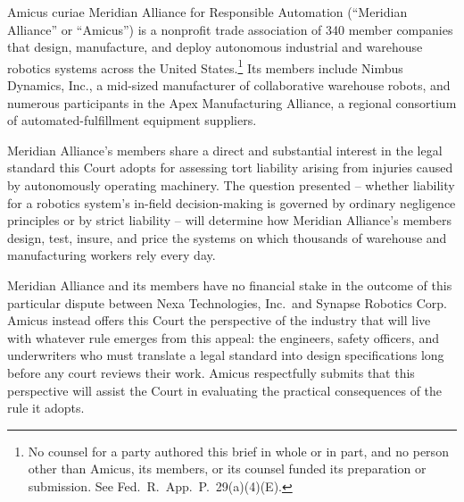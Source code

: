 
\setcounter{page}{1}
\pagestyle{fancy}
\BriefBody


Amicus curiae Meridian Alliance for Responsible Automation (``Meridian Alliance'' or ``Amicus'') is a nonprofit trade association of 340 member companies that design, manufacture, and deploy autonomous industrial and warehouse robotics systems across the United States.\footnote{No counsel for a party authored this brief in whole or in part, and no person other than Amicus, its members, or its counsel funded its preparation or submission. See Fed.\ R.\ App.\ P.\ 29(a)(4)(E).} Its members include Nimbus Dynamics, Inc., a mid-sized manufacturer of collaborative warehouse robots, and numerous participants in the Apex Manufacturing Alliance, a regional consortium of automated-fulfillment equipment suppliers.

Meridian Alliance's members share a direct and substantial interest in the legal standard this Court adopts for assessing tort liability arising from injuries caused by autonomously operating machinery. The question presented -- whether liability for a robotics system's in-field decision-making is governed by ordinary negligence principles or by strict liability -- will determine how Meridian Alliance's members design, test, insure, and price the systems on which thousands of warehouse and manufacturing workers rely every day.

Meridian Alliance and its members have no financial stake in the outcome of this particular dispute between Nexa Technologies, Inc.\ and Synapse Robotics Corp. Amicus instead offers this Court the perspective of the industry that will live with whatever rule emerges from this appeal: the engineers, safety officers, and underwriters who must translate a legal standard into design specifications long before any court reviews their work. Amicus respectfully submits that this perspective will assist the Court in evaluating the practical consequences of the rule it adopts.

\bigskip
